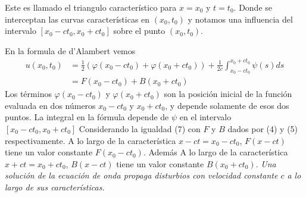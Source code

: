 \documentclass[11pt]{book}
\theoremstyle{plain}
\theoremstyle{definition}
\begin{document}
\begin{center}
\end{center}
Este es llamado el triangulo característico para $x =x_0$ y $t = t_0$. Donde se interceptan las curvas características en $(x_0,t_0)$ y notamos una influencia del intervalo $[x_0 - ct_0, x_0 + ct_0]$ sobre el punto $(x_0,t_0)$.

En la formula de d'Alambert vemos
\begin{align}
    u(x_0,t_0) & = \frac{1}{2}\left( \varphi(x_0 - ct_0) + \varphi(x_0 + ct_0)\right) +\frac{1}{2c}\int_{x_0-ct_0}^{x_0+ct_0}\psi(s)ds\\
    &=F(x_0-ct_0) + B(x_0+ct_0)
\end{align}
Los términos $\varphi(x_0 - ct_0)$ y $\varphi(x_0 + ct_0)$ son la posición inicial de la función evaluada en dos números $x_0 - ct_0$ y $x_0 + ct_0$, y depende solamente de esos dos puntos. La integral en la fórmula depende de $\psi$ en el intervalo $[x_0 - ct_0, x_0 + ct_0]$ Considerando la igualdad (7) con $F$ y $B$ dados por (4) y (5) respectivamente. A lo largo de la característica $x-ct = x_0-ct_0$, $F(x-ct)$ tiene un valor constante $F(x_0-ct_0)$. Además A lo largo de la característica $x+ct = x_0+ct_0$, $B(x-ct)$ tiene un valor constante $B(x_0+ct_0)$. \emph{Una solución de la ecuación de onda propaga disturbios con velocidad constante $c$ a lo largo de sus características.}

\newpage
\end{document}
